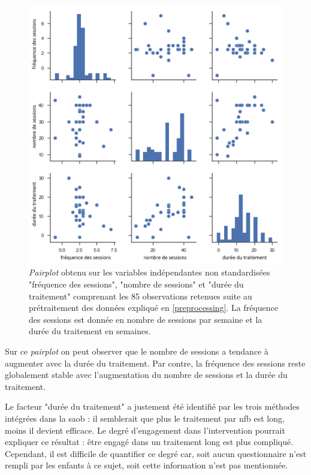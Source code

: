 \begin{figure}[h!]
  \centering
	\includegraphics[width=1\linewidth]{figures/chapter-3/factors-pairplot} 
  \caption{\textit{Pairplot} obtenu sur les variables indépendantes non standardisées "fréquence des sessions", "nombre de sessions" et "durée du traitement" 
	comprenant les 85 observations retenues suite au prétraitement des données expliqué en \ref{preprocessing}. La fréquence des sessions 
	est donnée en nombre de sessions par semaine et la durée du traitement en semaines.}
  \label{Figure:factors_pairplot}
\end{figure}

Sur ce \textit{pairplot} on peut observer que le nombre de sessions a tendance à augmenter avec la durée du traitement. Par contre, 
la fréquence des sessions reste globalement stable avec l'augmentation du nombre de sessions et la durée du traitement. 

Le facteur "durée du traitement" a justement été identifié par les trois méthodes intégrées dans la \gls{saob} : il semblerait que plus le traitement par 
\gls{nfb} est long, moins il devient efficace. Le degré d'engagement 
dans l'intervention pourrait expliquer ce résultat : être engagé dans un traitement long est plus compliqué. Cependant, il est difficile de quantifier ce degré car, 
soit aucun questionnaire n'est rempli par les enfants à ce sujet, soit cette information n'est pas mentionnée. 

